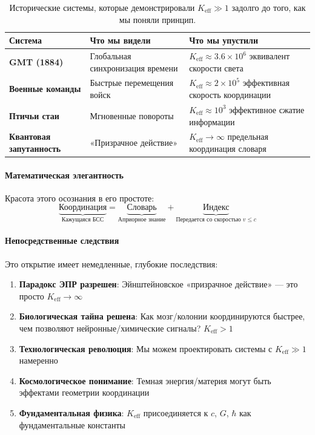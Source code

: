 \documentclass[11pt,a4paper]{article}
\begin{document}
	\begin{table}[htbp]
		\centering
		\begin{tabular}{p{}p{}p{}}
			\toprule
			\textbf{Система} & \textbf{Что мы видели} & \textbf{Что мы упустили} \\
			\midrule
			\textbf{GMT (1884)} & Глобальная синхронизация времени & $K_{\mathrm{eff}} \approx 3.6\times10^6$ эквивалент скорости света \\
			\textbf{Военные команды} & Быстрые перемещения войск & $K_{\mathrm{eff}} \approx 2\times10^5$ эффективная скорость координации \\
			\textbf{Птичьи стаи} & Мгновенные повороты & $K_{\mathrm{eff}} \approx 10^3$ эффективное сжатие информации \\
			\textbf{Квантовая запутанность} & «Призрачное действие» & $K_{\mathrm{eff}} \to \infty$ предельная координация словаря \\
			\bottomrule
		\end{tabular}
		\caption{Исторические системы, которые демонстрировали $K_{\mathrm{eff}} \gg 1$ задолго до того, как мы поняли принцип.}
	\end{table}
	
	\paragraph{Математическая элегантность}
	Красота этого осознания в его простоте:
	\begin{equation}
		\underbrace{\text{Координация}}_{\text{Кажущаяся БСС}} = 
		\underbrace{\text{Словарь}}_{\text{Априорное знание}} + 
		\underbrace{\text{Индекс}}_{\text{Передается со скоростью } v \leq c}
	\end{equation}
	
	\paragraph{Непосредственные следствия}
	Это открытие имеет немедленные, глубокие последствия:
	
	\begin{enumerate}
		\item \textbf{Парадокс ЭПР разрешен}: Эйнштейновское «призрачное действие» — это просто $K_{\mathrm{eff}} \to \infty$
		
		\item \textbf{Биологическая тайна решена}: Как мозг/колонии координируются быстрее, чем позволяют нейронные/химические сигналы? $K_{\mathrm{eff}} > 1$
		
		\item \textbf{Технологическая революция}: Мы можем проектировать системы с $K_{\mathrm{eff}} \gg 1$ намеренно
		
		\item \textbf{Космологическое понимание}: Темная энергия/материя могут быть эффектами геометрии координации
		
		\item \textbf{Фундаментальная физика}: $K_{\mathrm{eff}}$ присоединяется к $c$, $G$, $\hbar$ как фундаментальные константы
	\end{enumerate}
	
\end{document}
